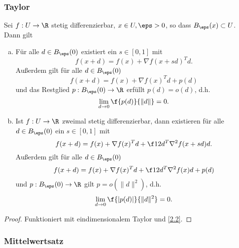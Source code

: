 \subsubsection{Taylor}

\begin{st} \label{2.3}
	Sei $f : U \to \R$ stetig differenzierbar, $x\in U, \eps > 0$, so dass $B_\eps(x) \subset U$.
	Dann gilt
	\begin{enumerate}[(a)]
		\item
			Für alle $d \in B_\eps(0)$ existiert ein $s \in [0,1]$ mit
			\[
				f(x+d) = f(x) + \nabla f(x + sd)^T d.
			\]
			Außerdem gilt für alle $d \in B_\eps(0)$
			\[
				f(x+d) = f(x) + \nabla f(x)^T d + p(d)
			\]
			und das Restglied $p: B_\eps(0) \to \R$ erfüllt $p(d) = o(d)$, d.h.
			\[
				\lim_{d\to 0} \f {p(d)}{\|d\|} = 0.
			\]
		\item
			Ist $f: U \to \R$ zweimal stetig differenzierbar, dann existieren für alle $d \in B_\eps(0)$ ein $s \in [0,1]$ mit
			\[
				f(x+d)
				= f(x) + \nabla f(x)^T d + \f 12 d^T \nabla^2 f(x+sd) d.
			\]
			Außerdem gilt für alle $d \in B_\eps(0)$
			\[
				f(x+d) = f(x) + \nabla f(x)^T d + \f 12 d^T \nabla^2 f(x) d + p(d)
			\]
			und $p: B_\eps(0) \to \R$ gilt $p = o(\|d\|^2)$, d.h.
			\[
				\lim_{d\to 0} \f{|p(d)|}{\|d\|^2} = 0.
			\]
	\end{enumerate}
	\begin{proof}
		Funktioniert mit eindimensionalem Taylor und \ref{2.2}.
	\end{proof}
\end{st}

\subsubsection{Mittelwertsatz}

